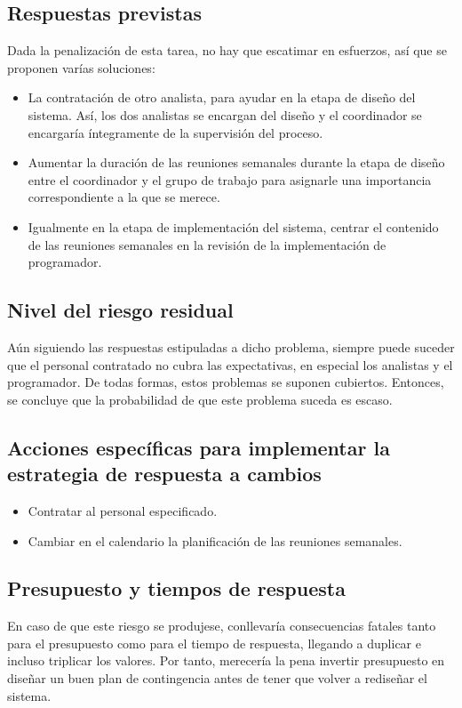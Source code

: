 \documentclass[11pt,a4paper,spanish,twoside]{book}
\begin{document}
\subsection{Respuestas previstas}
Dada la penalización de esta tarea, no hay que escatimar en esfuerzos, así
que se proponen varías soluciones:
\begin{itemize}
\item La contratación de otro analista, para ayudar en la etapa de diseño del
  sistema. Así, los dos analistas se encargan del diseño y el coordinador se
  encargaría íntegramente de la supervisión del proceso.
\item Aumentar la duración de las reuniones semanales durante la etapa de
  diseño entre el coordinador y el grupo de trabajo para asignarle una
  importancia correspondiente a la que se merece.
\item Igualmente en la etapa de implementación del sistema, centrar el
  contenido de las reuniones semanales en la revisión de la implementación de
  programador.
\end{itemize}

\subsection{Nivel del riesgo residual}
Aún siguiendo las respuestas estipuladas a dicho problema, siempre puede
suceder que el personal contratado no cubra las expectativas, en especial los
analistas y el programador. De todas formas, estos problemas se suponen
cubiertos. Entonces, se concluye que la probabilidad de que este problema
suceda es escaso.

\subsection{Acciones específicas para implementar la estrategia de respuesta
  a cambios}
\begin{itemize}
\item Contratar al personal especificado.
\item Cambiar en el calendario la planificación de las reuniones semanales.
\end{itemize}

\subsection{Presupuesto y tiempos de respuesta}
En caso de que este riesgo se produjese, conllevaría consecuencias fatales
tanto para el presupuesto como para el tiempo de respuesta, llegando a
duplicar e incluso triplicar los valores. Por tanto, merecería la pena
invertir presupuesto en diseñar un buen plan de contingencia antes de tener
que volver a rediseñar el sistema.
\end{document}
